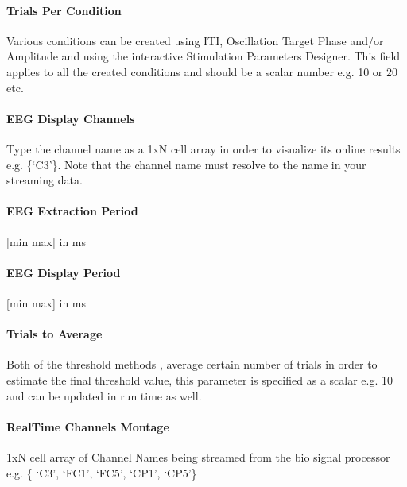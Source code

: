 \documentclass[letterpaper,10pt,english]{sphinxmanual}
\begin{document}
\paragraph{Trials Per Condition}
\label{\detokenize{11_TEPMeasurement:trials-per-condition}}
\sphinxAtStartPar
Various conditions can be created using ITI, Oscillation Target Phase and/or Amplitude and using the interactive Stimulation Parameters Designer. This field applies to all the created conditions and should be a scalar number e.g. 10 or 20 etc.


\paragraph{EEG Display Channels}
\label{\detokenize{11_TEPMeasurement:eeg-display-channels}}
\sphinxAtStartPar
Type the channel name as a 1xN cell array in order to visualize its online results e.g. \{‘C3’\}. Note that the channel name must resolve to the name in your streaming data.


\paragraph{EEG Extraction Period}
\label{\detokenize{11_TEPMeasurement:eeg-extraction-period}}
\sphinxAtStartPar
{[}min max{]} in ms


\paragraph{EEG Display Period}
\label{\detokenize{11_TEPMeasurement:eeg-display-period}}
\sphinxAtStartPar
{[}min max{]} in ms


\paragraph{Trials to Average}
\label{\detokenize{11_TEPMeasurement:trials-to-average}}
\sphinxAtStartPar
Both of the threshold methods , average certain number of trials in order to estimate the final threshold value, this parameter is specified as a scalar e.g. 10 and can be updated in run time as well.


\paragraph{Real\sphinxhyphen{}Time Channels Montage}
\label{\detokenize{11_TEPMeasurement:real-time-channels-montage}}
\sphinxAtStartPar
1xN cell array of Channel Names being streamed from the bio signal processor e.g. \{ ‘C3’, ‘FC1’, ‘FC5’, ‘CP1’, ‘CP5’\}
\end{document}
